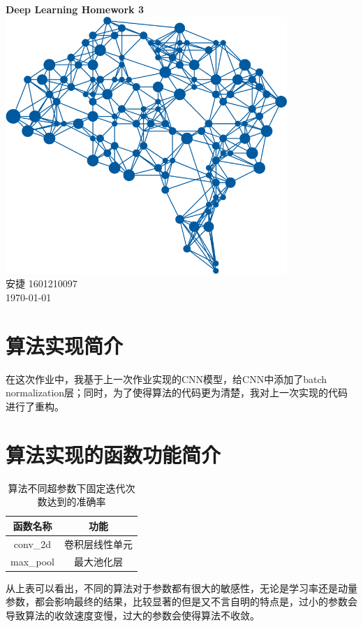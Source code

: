 \documentclass[a4paper, UTF8]{ctexrep}
\begin{document}
    \begin{titlepage}
        \centering
        \vspace{6cm}
        \LARGE{\textbf{Deep Learning Homework 3}}\\
        \vspace{4cm}
        \includegraphics[width=0.8\textwidth]{deepLearning.png}\\
        \vspace{4cm}
        \normalsize{安捷 1601210097}\\
        \normalsize{\today}
    \end{titlepage}
        \section{算法实现简介}
            在这次作业中，我基于上一次作业实现的CNN模型，给CNN中添加了batch normalization层；同时，为了使得算法的代码更为清楚，我对上一次实现的代码进行了重构。
        \section{算法实现的函数功能简介}
            \begin{table}[htbp!]
                \centering
                \begin{tabular}{cc}
                    \hline
                    函数名称 & 功能 \\
                    \hline
                    conv\_2d & 卷积层线性单元 \\
                    max\_pool & 最大池化层 \\
                    
                    \hline
                \end{tabular}
                \caption{算法不同超参数下固定迭代次数达到的准确率}
            \end{table}
            从上表可以看出，不同的算法对于参数都有很大的敏感性，无论是学习率还是动量参数，都会影响最终的结果，比较显著的但是又不言自明的特点是，过小的参数会导致算法的收敛速度变慢，过大的参数会使得算法不收敛。
            \clearpage
\end{document}
